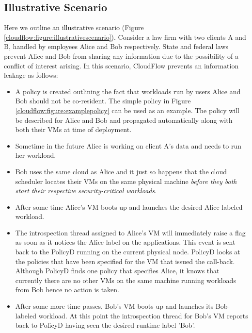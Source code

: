 \subsection{Illustrative Scenario}
Here we outline an illustrative scenario (Figure \ref{cloudflow:figure:illustrativescenario}). 
Consider a law firm with two clients A and B, handled by employees Alice and
Bob respectively.  State and federal laws prevent Alice and Bob from sharing
any information due to the possibility of a conflict of interest arising. 
In this scenario, CloudFlow prevents an information leakage as follows:




\begin{itemize}

\item A policy is created outlining the fact that workloads run by users
Alice and Bob should not be co-resident.  The simple policy in Figure
\ref{cloudflow:figure:examplepolicy} can be used as an example.  The policy
will be described for Alice and Bob and propagated automatically along with
both their VMs at time of deployment.

\item Sometime in the future Alice is working on client A's data and needs
to run her workload.

\item Bob uses the same cloud as Alice and it just so happens that the cloud
scheduler locates their VMs on the same physical machine {\em before they both
start their respective security-critical workloads}.

\item After some time Alice's VM boots up and launches the desired
Alice-labeled workload. 

\item The introspection thread assigned to Alice's VM will immediately raise a flag
as soon as it notices the Alice label on the applications.  This event is 
sent back to the PolicyD running on the current physical node.  PolicyD
looks at the policies that have been specified for the VM that issued the
call-back.  Although PolicyD finds one policy that specifies Alice, it knows
that currently there are no other VMs on the same machine running workloads
from Bob hence no action is taken.

\item After some more time passes, Bob's VM boots up and launches its
Bob-labeled workload.  At this point the introspection
thread for Bob's VM reports back to PolicyD
having seen the desired runtime label 'Bob'.


\end{itemize}
